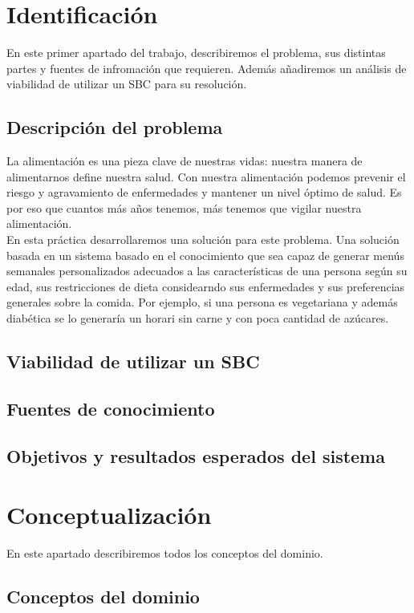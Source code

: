 \documentclass[12]{article}
\begin{document}
\section{Identificación}
En este primer apartado del trabajo, describiremos el problema, sus distintas partes y fuentes de infromación que requieren. Además añadiremos un análisis de viabilidad de utilizar un SBC para su resolución.

\subsection{Descripción del problema}
La alimentación es una pieza clave de nuestras vidas: nuestra manera de alimentarnos define nuestra salud. Con nuestra alimentación podemos prevenir el riesgo y agravamiento de enfermedades y mantener un nivel óptimo de salud. Es por eso que cuantos más años tenemos, más tenemos que vigilar nuestra alimentación.
\\
En esta práctica desarrollaremos una solución para este problema. Una solución basada en un sistema basado en el conocimiento que sea capaz de generar menús semanales personalizados adecuados a las características de una persona según su edad, sus restricciones de dieta considearndo sus enfermedades y sus preferencias generales sobre la comida. Por ejemplo, si una persona es vegetariana y además diabética se lo generaría un horari sin carne y con poca cantidad de azúcares. 

\subsection{Viabilidad de utilizar un SBC}
\subsection{Fuentes de conocimiento}
\subsection{Objetivos y resultados esperados del sistema}


\section{Conceptualización}
En este apartado describiremos todos los conceptos del dominio.

\subsection{Conceptos del dominio}
\end{document}
